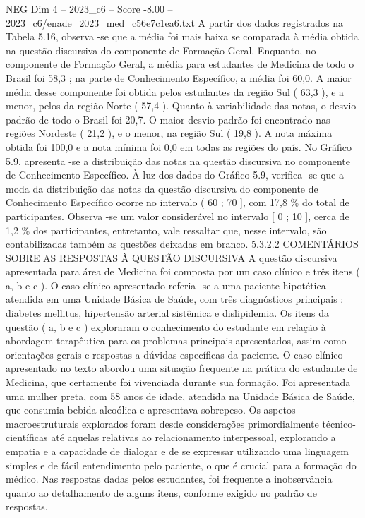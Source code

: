 \begin{textsample}{NEG Dim 4 – 2023\_c6 – Score -8.00 – 2023\_c6/enade\_2023\_med\_c56e7c1ea6.txt}
A partir dos dados registrados na Tabela 5.16, observa -se que a média foi mais baixa se comparada à média obtida na questão discursiva do componente de Formação Geral.
Enquanto, no componente de Formação Geral, a média para estudantes de Medicina de todo o Brasil foi 58,3 ; na parte de Conhecimento Específico, a média foi 60,0.
A maior média desse componente foi obtida pelos estudantes da região Sul ( 63,3 ), e a menor, pelos da região Norte ( 57,4 ).
Quanto à variabilidade das notas, o desvio-padrão de todo o Brasil foi 20,7.
O maior desvio-padrão foi encontrado nas regiões Nordeste ( 21,2 ), e o menor, na região Sul ( 19,8 ).
A nota máxima obtida foi 100,0 e a nota mínima foi 0,0 em todas as regiões do país.
No Gráfico 5.9, apresenta -se a distribuição das notas na questão discursiva no componente de Conhecimento Específico.
À luz dos dados do Gráfico 5.9, verifica -se que a moda da distribuição das notas da questão discursiva do componente de Conhecimento Específico ocorre no intervalo ( 60 ; 70 ], com 17,8 \% do total de participantes.
Observa -se um valor considerável no intervalo [ 0 ; 10 ], cerca de 1,2 \% dos participantes, entretanto, vale ressaltar que, nesse intervalo, são contabilizadas também as questões deixadas em branco. 5.3.2.2 COMENTÁRIOS SOBRE AS RESPOSTAS À QUESTÃO DISCURSIVA A questão discursiva apresentada para área de Medicina foi composta por um caso clínico e três itens ( a, b e c ).
O caso clínico apresentado referia -se a uma paciente hipotética atendida em uma Unidade Básica de Saúde, com três diagnósticos principais : diabetes mellitus, hipertensão arterial sistêmica e dislipidemia.
Os itens da questão ( a, b e c ) exploraram o conhecimento do estudante em relação à abordagem terapêutica para os problemas principais apresentados, assim como orientações gerais e respostas a dúvidas específicas da paciente.
O caso clínico apresentado no texto abordou uma situação frequente na prática do estudante de Medicina, que certamente foi vivenciada durante sua formação.
Foi apresentada uma mulher preta, com 58 anos de idade, atendida na Unidade Básica de Saúde, que consumia bebida alcoólica e apresentava sobrepeso.
Os aspetos macroestruturais explorados foram desde considerações primordialmente técnico-científicas até aquelas relativas ao relacionamento interpessoal, explorando a empatia e a capacidade de dialogar e de se expressar utilizando uma linguagem simples e de fácil entendimento pelo paciente, o que é crucial para a formação do médico.
Nas respostas dadas pelos estudantes, foi frequente a inobservância quanto ao detalhamento de alguns itens, conforme exigido no padrão de respostas.

\end{textsample}
